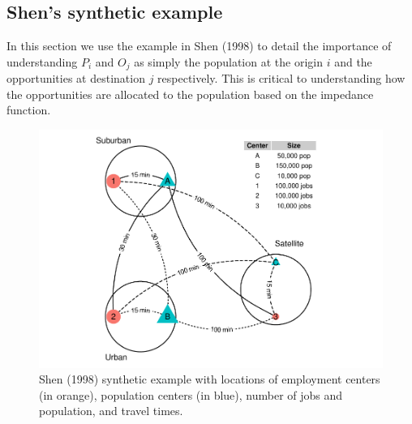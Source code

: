 \documentclass[]{elsarticle} %
\begin{document}
\hypertarget{shens-synthetic-example}{%
\subsection{Shen's synthetic example}\label{shens-synthetic-example}}

In this section we use the example in Shen (1998) to detail the
importance of understanding \(P_i\) and \(O_j\) as simply the population
at the origin \(i\) and the opportunities at destination \(j\)
respectively. This is critical to understanding how the opportunities
are allocated to the population based on the impedance function.

\begin{figure}

{\centering \includegraphics[width=1\linewidth]{Spatial-Availability-Refreshed_files/figure-latex/create-figure-with-toy-example-1} 

}

\caption{\label{fig:plot-toy-example} Shen (1998) synthetic example with locations of employment centers (in orange), population centers (in blue), number of jobs and population, and travel times.}\label{fig:create-figure-with-toy-example}
\end{figure}

 
  \providecommand{\huxb}[2]{\arrayrulecolor[RGB]{#1}\global\arrayrulewidth=#2pt}
  \providecommand{\huxvb}[2]{\color[RGB]{#1}\vrule width #2pt}
  \providecommand{\huxtpad}[1]{\rule{0pt}{#1}}
  \providecommand{\huxbpad}[1]{\rule[-#1]{0pt}{#1}}
\end{document}
